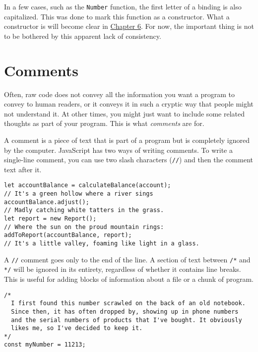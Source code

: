 In a few cases, such as the \lstinline`Number` function, the first letter of a binding is also capitalized. This was done to mark this function as a constructor. What a constructor is will become clear in \hyperref[object.constructors]{Chapter 6}. For now, the important thing is not to be bothered by this apparent lack of consistency.

\section{Comments}

Often, raw code does not convey all the information you want a program to convey to human readers, or it conveys it in such a cryptic way that people might not understand it. At other times, you might just want to include some related thoughts as part of your program. This is what \emph{comments} are for.

A comment is a piece of text that is part of a program but is completely ignored by the computer. JavaScript has two ways of writing comments. To write a single-line comment, you can use two slash characters (\lstinline`//`) and then the comment text after it.

\begin{lstlisting}
let accountBalance = calculateBalance(account);
// It's a green hollow where a river sings
accountBalance.adjust();
// Madly catching white tatters in the grass.
let report = new Report();
// Where the sun on the proud mountain rings:
addToReport(accountBalance, report);
// It's a little valley, foaming like light in a glass.
\end{lstlisting}
\noindent{}

A \lstinline`//` comment goes only to the end of the line. A section of text between \lstinline`/*` and \lstinline`*/` will be ignored in its entirety, regardless of whether it contains line breaks. This is useful for adding blocks of information about a file or a chunk of program.

\begin{lstlisting}
/*
  I first found this number scrawled on the back of an old notebook.
  Since then, it has often dropped by, showing up in phone numbers
  and the serial numbers of products that I've bought. It obviously
  likes me, so I've decided to keep it.
*/
const myNumber = 11213;
\end{lstlisting}
\noindent

